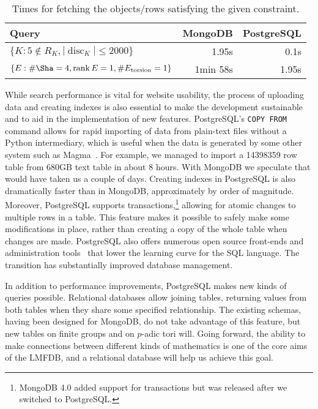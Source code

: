 \documentclass{amsart}
\DeclareMathOperator{\rank}{rank}
\begin{document}
\begin{table}[h!]
  \begin{center}
  \begin{tabular}{l|r|r}
Query & MongoDB & PostgreSQL\\
\hline
$\{K : 5 \notin R_K, |\operatorname{disc}_K| \leq 2000\}$ & 1.95s & 0.1s\\
$\{E : \# \Sha = 4, \rank E = 1, \# E_{\text{torsion}} = 1\}$ & 1min 58s & 1.95s\\
\end{tabular}
\caption{Times for fetching the objects/rows satisfying the given constraint.}
\label{table:indexless}
\end{center}
\end{table}



While search performance is vital for website usability, the process of uploading data and creating indexes is also essential to make the development sustainable and to aid in the implementation of new features.
PostgreSQL's \texttt{COPY FROM} command allows for rapid importing of data from plain-text files without a Python intermediary, which is useful when the data is generated by some other system such as Magma~\cite{magma}.
For example, we managed to import a 14398359 row table from 680GB text table in about 8 hours.
With MongoDB we speculate that would have taken us a couple of days.
Creating indexes in PostgreSQL is also dramatically faster than in MongoDB, approximately by order of magnitude.
Moreover, PostgreSQL supports transactions,\footnote{MongoDB 4.0 added support for transactions but was released after we switched to PostgreSQL.} allowing for atomic changes to multiple rows in a table.
This feature makes it possible to safely make some modifications in place, rather than creating a copy of the whole table when changes are made.
PostgreSQL also offers numerous open source front-ends and administration tools~\cite{pgadmin,adminer} that lower the learning curve for the SQL language.
The transition has substantially improved database management.

In addition to performance improvements, PostgreSQL makes new kinds of queries possible.
Relational databases allow joining tables, returning values from both tables when they share some specified relationship.
The existing schemas, having been designed for MongoDB, do not take advantage of this feature, but new tables on finite groups and on $p$-adic tori will.
Going forward, the ability to make connections between different kinds of mathematics is one of the core aims of the LMFDB, and a relational database will help us achieve this goal.
\end{document}
